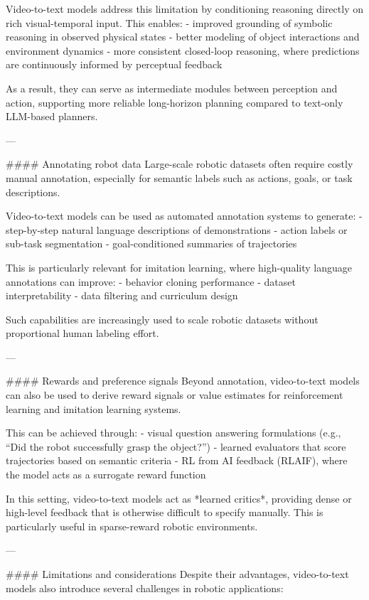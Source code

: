 Video-to-text models address this limitation by conditioning reasoning directly on rich visual-temporal input. This enables:
- improved grounding of symbolic reasoning in observed physical states
- better modeling of object interactions and environment dynamics
- more consistent closed-loop reasoning, where predictions are continuously informed by perceptual feedback

As a result, they can serve as intermediate modules between perception and action, supporting more reliable long-horizon planning compared to text-only LLM-based planners.

---

#### Annotating robot data
Large-scale robotic datasets often require costly manual annotation, especially for semantic labels such as actions, goals, or task descriptions.

Video-to-text models can be used as automated annotation systems to generate:
- step-by-step natural language descriptions of demonstrations
- action labels or sub-task segmentation
- goal-conditioned summaries of trajectories

This is particularly relevant for imitation learning, where high-quality language annotations can improve:
- behavior cloning performance
- dataset interpretability
- data filtering and curriculum design

Such capabilities are increasingly used to scale robotic datasets without proportional human labeling effort.

---

#### Rewards and preference signals
Beyond annotation, video-to-text models can also be used to derive reward signals or value estimates for reinforcement learning and imitation learning systems.

This can be achieved through:
- visual question answering formulations (e.g., “Did the robot successfully grasp the object?”)
- learned evaluators that score trajectories based on semantic criteria
- RL from AI feedback (RLAIF), where the model acts as a surrogate reward function

In this setting, video-to-text models act as *learned critics*, providing dense or high-level feedback that is otherwise difficult to specify manually. This is particularly useful in sparse-reward robotic environments.

---

#### Limitations and considerations
Despite their advantages, video-to-text models also introduce several challenges in robotic applications:

